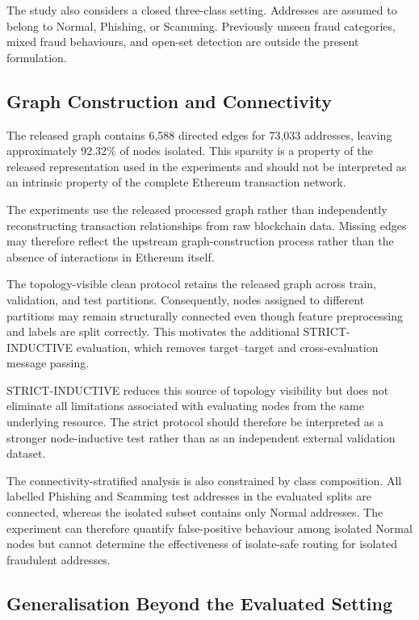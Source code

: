 \documentclass{ieeeaccess}
\begin{document}
The study also considers a closed three-class setting. Addresses are assumed to belong to Normal, Phishing, or Scamming. Previously unseen fraud categories, mixed fraud behaviours, and open-set detection are outside the present formulation.


\subsection{Graph Construction and Connectivity}

The released graph contains 6,588 directed edges for 73,033 addresses, leaving approximately 92.32\% of nodes isolated. This sparsity is a property of the released representation used in the experiments and should not be interpreted as an intrinsic property of the complete Ethereum transaction network.

The experiments use the released processed graph rather than independently reconstructing transaction relationships from raw blockchain data. Missing edges may therefore reflect the upstream graph-construction process rather than the absence of interactions in Ethereum itself.

The topology-visible clean protocol retains the released graph across train, validation, and test partitions. Consequently, nodes assigned to different partitions may remain structurally connected even though feature preprocessing and labels are split correctly. This motivates the additional STRICT-INDUCTIVE evaluation, which removes target--target and cross-evaluation message passing.

STRICT-INDUCTIVE reduces this source of topology visibility but does not eliminate all limitations associated with evaluating nodes from the same underlying resource. The strict protocol should therefore be interpreted as a stronger node-inductive test rather than as an independent external validation dataset.

The connectivity-stratified analysis is also constrained by class composition. All labelled Phishing and Scamming test addresses in the evaluated splits are connected, whereas the isolated subset contains only Normal addresses. The experiment can therefore quantify false-positive behaviour among isolated Normal nodes but cannot determine the effectiveness of isolate-safe routing for isolated fraudulent addresses.


\subsection{Generalisation Beyond the Evaluated Setting}
\end{document}
